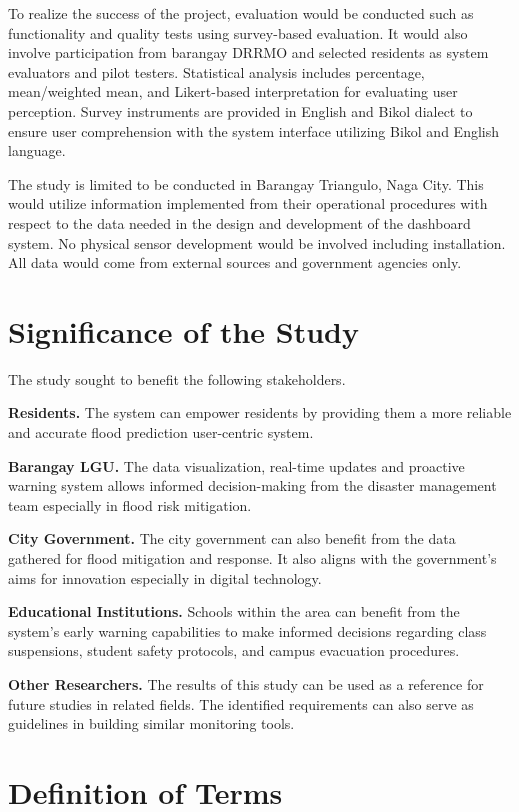 \documentclass{research}
\begin{document}
To realize the success of the project, evaluation would be conducted such as functionality and quality tests using survey-based evaluation. It would also involve participation from barangay DRRMO and selected residents as system evaluators and pilot testers. Statistical analysis includes percentage, mean/weighted mean, and Likert-based interpretation for evaluating user perception. Survey instruments are provided in English and Bikol dialect to ensure user comprehension with the system interface utilizing Bikol and English language.

The study is limited to be conducted in Barangay Triangulo, Naga City. This would utilize information implemented from their operational procedures with respect to the data needed in the design and development of the dashboard system. No physical sensor development would be involved including installation. All data would come from external sources and government agencies only.

\section{Significance of the Study}

The study sought to benefit the following stakeholders.

\textbf{Residents.} The system can empower residents by providing them a more reliable and accurate flood prediction user-centric system.

\textbf{Barangay LGU.} The data visualization, real-time updates and proactive warning system allows informed decision-making from the disaster management team especially in flood risk mitigation.

\textbf{City Government.} The city government can also benefit from the data gathered for flood mitigation and response. It also aligns with the government's aims for innovation especially in digital technology.

\textbf{Educational Institutions.} Schools within the area can benefit from the system's early warning capabilities to make informed decisions regarding class suspensions, student safety protocols, and campus evacuation procedures.

\textbf{Other Researchers.} The results of this study can be used as a reference for future studies in related fields. The identified requirements can also serve as guidelines in building similar monitoring tools.

\section{Definition of Terms}
\end{document}
